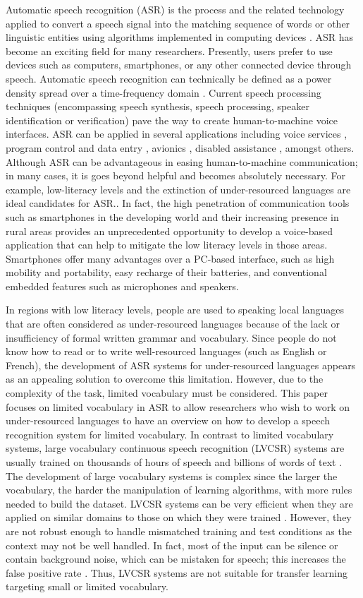 

\label{sec:introduction}
Automatic speech recognition (ASR) is the process and the related technology applied to convert a speech signal into the matching sequence of words or other linguistic entities using algorithms implemented in computing devices   . ASR has become an exciting field for many researchers. Presently, users prefer to use devices such as computers, smartphones, or any other connected device through speech. 
Automatic speech recognition can technically be defined as a power density spread over a time-frequency domain . Current speech processing techniques (encompassing speech synthesis, speech processing, speaker identification or verification) pave the way to create human-to-machine voice interfaces. ASR can be applied in several applications including  voice services , program control and data entry , avionics , disabled assistance , amongst others.
Although ASR can be advantageous in easing human-to-machine communication; in many cases, it is goes beyond helpful and becomes absolutely necessary. For example, low-literacy levels and the extinction of under-resourced languages are ideal candidates for ASR.. In fact, the high penetration of communication tools such as smartphones in the developing world  and their increasing presence in rural areas  provides an unprecedented opportunity to develop a voice-based application that can help to mitigate the low literacy levels in those areas. Smartphones offer many advantages over a PC-based interface, such as high mobility and portability, easy recharge of their batteries, and conventional embedded features such as microphones and speakers.

In regions with low literacy levels, people are used to speaking local languages that are often considered as under-resourced languages because of the lack or insufficiency of formal written grammar and vocabulary. Since people do not know how to read or to write well-resourced languages (such as English or French), the development of ASR systems for under-resourced languages appears as an appealing solution to overcome this limitation. However, due to the complexity of the task, limited vocabulary must be considered. 
This paper focuses on limited vocabulary in ASR to allow researchers who wish to work on under-resourced languages to have an overview on how to develop a speech recognition system for limited vocabulary. In contrast to limited vocabulary systems, large vocabulary continuous speech recognition (LVCSR) systems are usually trained on thousands of hours of speech and billions of words of text . The development of large vocabulary systems is complex since the larger the vocabulary, the harder the manipulation of learning algorithms, with more rules needed to build the dataset. LVCSR systems can be very efficient when they are applied on similar domains to those on which they were trained . However, they are not robust enough to handle mismatched training and test conditions as the context may not be well handled. In fact, most of the input can be silence or contain background noise, which can be mistaken for speech; this increases the false positive rate . Thus, LVCSR systems are not suitable for transfer learning targeting small or limited vocabulary.

